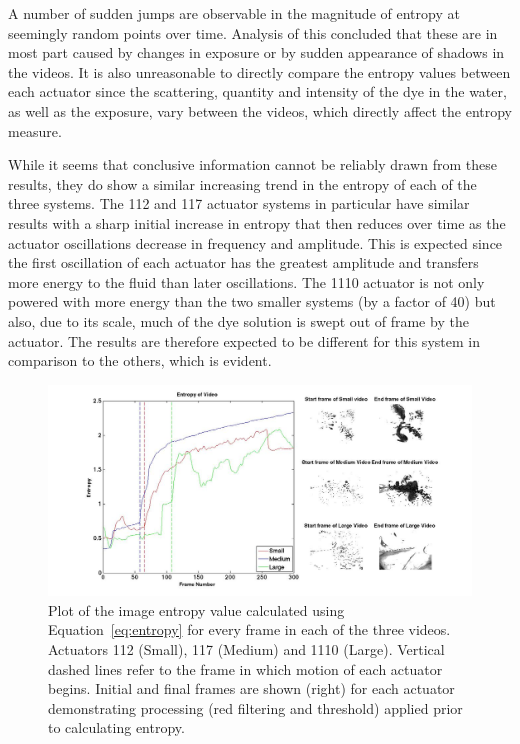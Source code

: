 A number of sudden jumps are observable in the magnitude of entropy at seemingly random points over time. Analysis of this concluded that these are in most part caused by changes in exposure or by sudden appearance of shadows in the videos. It is also unreasonable to directly compare the entropy values between each actuator since the scattering, quantity and intensity of the dye in the water, as well as the exposure, vary between the videos, which directly affect the entropy measure. 

While it seems that conclusive information cannot be reliably drawn from these results, they do show a similar increasing trend in the entropy of each of the three systems. The 112 and 117 actuator systems in particular have similar results with a sharp initial increase in entropy that then reduces over time as the actuator oscillations decrease in frequency and amplitude. This is expected since the first oscillation of each actuator has the greatest amplitude and transfers more energy to the fluid than later oscillations. The 1110 actuator is not only powered with more energy than the two smaller systems (by a factor of 40) but also, due to its scale, much of the dye solution is swept out of frame by the actuator. The results are therefore expected to be different for this system in comparison to the others, which is evident.


\begin{figure}[H]
	\centering
	\includegraphics[width=1\textwidth]{Pictures/entropyplot.jpg}
    \caption{Plot of the image entropy value calculated using Equation~\ref{eq:entropy} for every frame in each of the three videos. Actuators 112 (Small), 117 (Medium) and 1110 (Large). Vertical dashed lines refer to the frame in which  motion of each actuator begins. Initial and final frames are shown (right) for each actuator demonstrating processing (red filtering and threshold) applied prior to calculating entropy.}
    \label{fig:entplot}
\end{figure}



